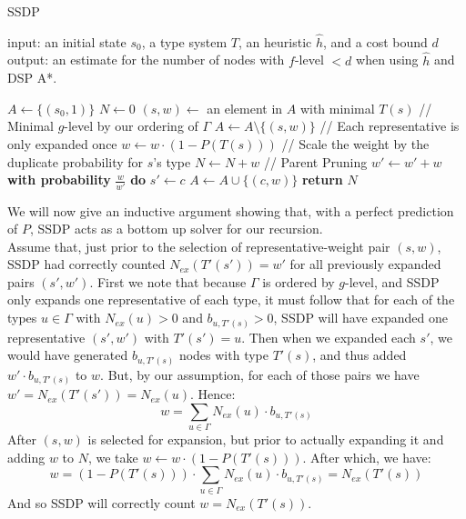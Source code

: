\documentclass{article}
\begin{document}
\begin{algorithm}
\caption{SSDP}\label{euclid}
  input: an initial state \(s_0\), a type system \(T\), an heuristic \(\hat{h}\), and a cost bound \(d\) \\
  output: an estimate for the number of nodes with \(f\)-level \(< d\) when using \(\hat{h}\) and DSP A*.
\begin{algorithmic}[1]
  \State $A \gets \{(s_0, 1)\}$
  \State \(N \gets 0\)
  \State \((s, w) \gets\) an element in \(A\) with minimal \(T(s)\) // Minimal \(g\)-level by our ordering of \(\Gamma\)
  \State \(A \gets A \setminus \{(s,w)\}\) // Each representative is only expanded once
  \State \(w \gets w \cdot (1 - P(T(s)))\) // Scale the weight by the duplicate probability for \(s\)'s type
  \State \(N \gets N + w\)
   // Parent Pruning
  \State \(w' \gets w' + w\)
  \State \textbf{with probability} \(\frac{w}{w'}\) \textbf{do} \(s' \gets c\)
  \Else
  \State \(A \gets A \cup \{(c, w)\}\)
  \EndIf
  \EndIf
  \EndFor
  \EndWhile
\State \textbf{return }\(N\)
\end{algorithmic}
\end{algorithm}

We will now give an inductive argument showing that, with a perfect prediction of \(P\),
SSDP acts as a bottom up solver for our recursion. \\

Assume that, just prior to the selection of representative-weight pair \((s, w)\),
SSDP had correctly counted \(N_{ex}(T'(s')) = w'\) for all previously expanded pairs \((s', w')\).
First we note that because \(\Gamma\) is ordered by \(g\)-level, and SSDP only expands one representative of each type,
it must follow that for each of the types \(u \in \Gamma\) with \(N_{ex}(u) > 0\) and \(b_{u,T'(s)} > 0\),
SSDP will have expanded one representative \((s', w')\) with \(T'(s') = u\).
Then when we expanded each \(s'\), we would have generated \(b_{u,T'(s)}\) nodes with type \(T'(s)\),
and thus added \(w' \cdot  b_{u,T'(s)}\) to \(w\).
But, by our assumption, for each of those pairs we have \(w' = N_{ex}(T'(s')) = N_{ex}(u)\).
Hence:
\[w = \sum_{u \in \Gamma} N_{ex}(u) \cdot b_{u,T'(s)}\]
After \((s, w)\) is selected for expansion, but prior to actually expanding it and adding \(w\)
to \(N\), we take \(w \gets w \cdot (1 - P(T'(s)))\). After which,
we have:
\[w = (1 - P(T'(s))) \cdot  \sum_{u \in \Gamma} N_{ex}(u) \cdot  b_{u,T'(s)} = N_{ex}(T'(s))\]
And so SSDP will correctly count \(w = N_{ex}(T'(s))\). \\
\end{document}
